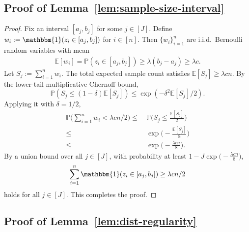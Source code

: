 \documentclass[11pt]{article}
\theoremstyle{statplain}
\theoremstyle{statdefinition}
\newcommand{\sumin}{\sum_{i=1}^n}
\newcommand{\E}{\mathbb{E}}
\newcommand{\PP}{\mathbb{P}}
\newcommand{\0}{\mathbf{0}}
\begin{document}
\subsection{Proof of Lemma~\ref{lem:sample-size-interval}}\label{proof_lem:sample-size-interval}
\begin{proof}
Fix an interval $[a_j, b_j]$ for some $j \in [J]$.
Define $w_i := \mathbbm{1}(z_i \in [a_j,b_j])$ for $i \in [n]$. Then $\{w_i\}_{i=1}^n$ are i.i.d.\ Bernoulli random variables with mean
\begin{align*}
    \E[w_i] 
    = \PP(z_i \in [a_j,b_j])
    \ge \lambda (b_j-a_j)
    \ge \lambda c. 
\end{align*}
Let $S_j := \sumin w_i$. The total expected sample count satisfies $\E[S_j] \ge \lambda cn$. 
By the lower-tail multiplicative Chernoff bound,
$$\mathbb{P}(S_j \le (1-\delta)\E[S_j]) \le \exp(-\delta^2 \E[S_j]/2).$$ 
Applying it with $\delta = 1/2$,  
\begin{align*}
    \PP\Big(\sumin w_i < \lambda cn/2\Big) 
    \le &~ \PP\Big(S_j \le \frac{\E[S_j]}{2}\Big) \\
    \le &~ \exp\Big(-\frac{\E[S_j]}{8}\Big) \\
    \le &~ \exp\Big(-\frac{\lambda cn}{8}\Big).
\end{align*}
By a union bound over all $j \in [J]$, with probability at least $1-J\exp\Big(-\frac{\lambda cn}{8}\Big)$,
\begin{align*}
    \sumin \mathbbm{1}(z_i \in [a_j,b_j]) \geq \lambda cn/2
\end{align*}
holds for all $j \in [J]$. This completes the proof.
\end{proof}

\subsection{Proof of Lemma~\ref{lem:dist-regularity}}\label{proof_lem:dist-regularity}
\end{document}
